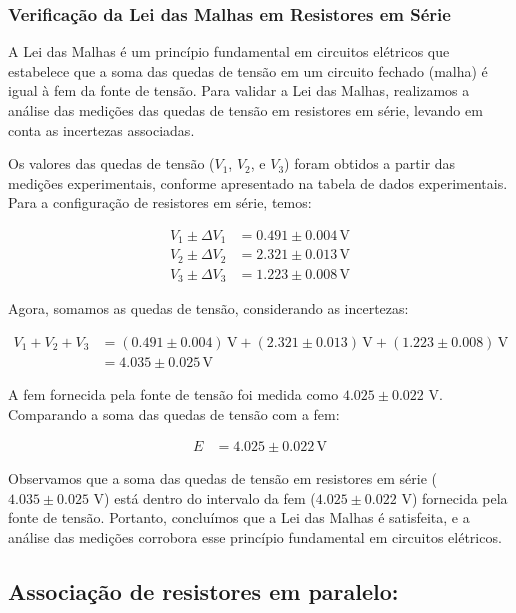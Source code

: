 \documentclass{article}
\begin{document}
\subsubsection{Verificação da Lei das Malhas em Resistores em Série}
A Lei das Malhas é um princípio fundamental em circuitos elétricos que estabelece que a soma das quedas de tensão em um circuito fechado (malha) é igual à fem da fonte de tensão. Para validar a Lei das Malhas, realizamos a análise das medições das quedas de tensão em resistores em série, levando em conta as incertezas associadas.

Os valores das quedas de tensão (\(V_1\), \(V_2\), e \(V_3\)) foram obtidos a partir das medições experimentais, conforme apresentado na tabela de dados experimentais. Para a configuração de resistores em série, temos:

\begin{align*}
V_1 \pm \Delta V_1 &= 0.491 \pm 0.004 \, \text{V} \\
V_2 \pm \Delta V_2 &= 2.321 \pm 0.013 \, \text{V} \\
V_3 \pm \Delta V_3 &= 1.223 \pm 0.008 \, \text{V}
\end{align*}

Agora, somamos as quedas de tensão, considerando as incertezas:

\begin{align*}
V_1 + V_2 + V_3 &= (0.491 \pm 0.004) \, \text{V} + (2.321 \pm 0.013) \, \text{V} + (1.223 \pm 0.008) \, \text{V} \\
&= 4.035 \pm 0.025 \, \text{V}
\end{align*}

A fem fornecida pela fonte de tensão foi medida como \(4.025 \pm 0.022\) V. Comparando a soma das quedas de tensão com a fem:

\begin{align*}
E &= 4.025 \pm 0.022 \, \text{V}
\end{align*}

Observamos que a soma das quedas de tensão em resistores em série (\(4.035 \pm 0.025\) V) está dentro do intervalo da fem (\(4.025 \pm 0.022\) V) fornecida pela fonte de tensão. Portanto, concluímos que a Lei das Malhas é satisfeita, e a análise das medições corrobora esse princípio fundamental em circuitos elétricos.

\subsection{Associação de resistores em paralelo:}
\end{document}
